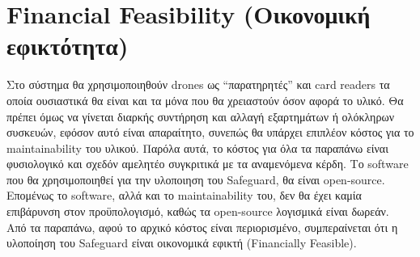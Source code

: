 \documentclass{article}
\begin{document}
\section{Financial Feasibility (Οικονομική εφικτότητα)}
	Στο σύστημα θα χρησιμοποιηθούν drones ως “παρατηρητές” και card readers τα οποία ουσιαστικά θα είναι και τα μόνα που θα χρειαστούν όσον αφορά το υλικό. Θα πρέπει όμως να γίνεται διαρκής συντήρηση και αλλαγή εξαρτημάτων ή ολόκληρων συσκευών, εφόσον αυτό είναι απαραίτητο, συνεπώς θα υπάρχει επιπλέον κόστος για το maintainability του υλικού. Παρόλα αυτά, το κόστος για όλα τα παραπάνω είναι φυσιολογικό και σχεδόν αμελητέο συγκριτικά με τα αναμενόμενα κέρδη.
	Το software που θα χρησιμοποιηθεί για την υλοποιηση του Safeguard, θα είναι open-source. Επομένως το software, αλλά και το maintainability του, δεν θα έχει καμία επιβάρυνση στον προϋπολογισμό, καθώς τα open-source λογισμικά είναι δωρεάν. \\
	Από τα παραπάνω, αφού το αρχικό κόστος είναι περιορισμένο, συμπεραίνεται ότι η υλοποίηση του Safeguard είναι οικονομικά εφικτή (Financially Feasible).
	
\newpage 
\end{document}
